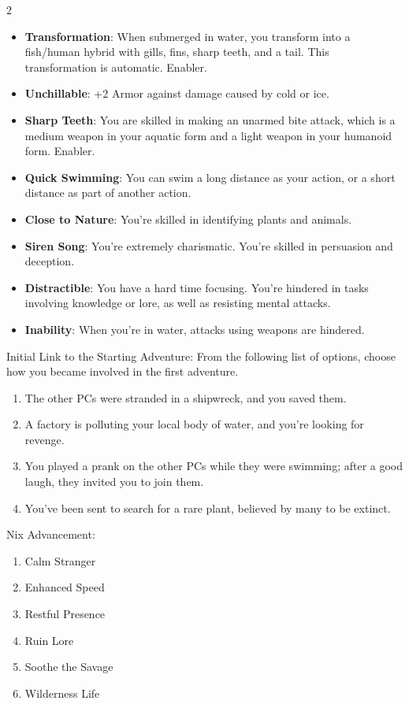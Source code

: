 \begin{multicols}{2}
\begin{itemize}
\item \textbf{Transformation}: When submerged in water, you transform into a fish/human hybrid with gills, fins, sharp teeth, and a tail. This transformation is automatic. Enabler.
\item \textbf{Unchillable}: +2 Armor against damage caused by cold or ice.
\item \textbf{Sharp Teeth}: You are skilled in making an unarmed bite attack, which is a medium weapon in your aquatic form and a light weapon in your humanoid form. Enabler.
\item \textbf{Quick Swimming}: You can swim a long distance as your action, or a short distance as part of another action.
\item \textbf{Close to Nature}: You’re skilled in identifying plants and animals.
\item \textbf{Siren Song}: You’re extremely charismatic. You’re skilled in persuasion and deception.
\item \textbf{Distractible}: You have a hard time focusing. You’re hindered in tasks involving knowledge or lore, as well as resisting mental attacks.
\item \textbf{Inability}: When you’re in water, attacks using weapons are hindered.
\end{itemize}

Initial Link to the Starting Adventure: From the following list of options, choose how you became involved in the first adventure.

\begin{enumerate}
\item The other PCs were stranded in a shipwreck, and you saved them.
\item A factory is polluting your local body of water, and you’re looking for revenge.
\item You played a prank on the other PCs while they were swimming; after a good laugh, they invited you to join them.
\item You’ve been sent to search for a rare plant, believed by many to be extinct.
\end{enumerate}

Nix Advancement:
\begin{enumerate}
\item Calm Stranger 
\item Enhanced Speed 
\item Restful Presence 
\item Ruin Lore 
\item Soothe the Savage 
\item Wilderness Life 
\end{enumerate}


\end{multicols}
